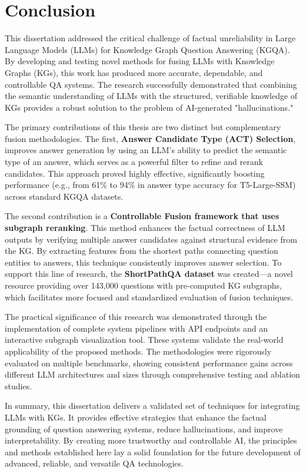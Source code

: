 \chapter*{Conclusion}
\label{chap:conclusion}

This dissertation addressed the critical challenge of factual unreliability in Large Language Models (LLMs) for Knowledge Graph Question Answering (KGQA). By developing and testing novel methods for fusing LLMs with Knowledge Graphs (KGs), this work has produced more accurate, dependable, and controllable QA systems. The research successfully demonstrated that combining the semantic understanding of LLMs with the structured, verifiable knowledge of KGs provides a robust solution to the problem of AI-generated "hallucinations."

The primary contributions of this thesis are two distinct but complementary fusion methodologies. The first, \textbf{Answer Candidate Type (ACT) Selection}, improves answer generation by using an LLM's ability to predict the semantic type of an answer, which serves as a powerful filter to refine and rerank candidates. This approach proved highly effective, significantly boosting performance (e.g., from 61\% to 94\% in answer type accuracy for T5-Large-SSM) across standard KGQA datasets.

The second contribution is a \textbf{Controllable Fusion framework that uses subgraph reranking}. This method enhances the factual correctness of LLM outputs by verifying multiple answer candidates against structural evidence from the KG. By extracting features from the shortest paths connecting question entities to answers, this technique consistently improves answer selection. To support this line of research, the \textbf{ShortPathQA dataset} was created—a novel resource providing over 143,000 questions with pre-computed KG subgraphs, which facilitates more focused and standardized evaluation of fusion techniques.

The practical significance of this research was demonstrated through the implementation of complete system pipelines with API endpoints and an interactive subgraph visualization tool. These systems validate the real-world applicability of the proposed methods. The methodologies were rigorously evaluated on multiple benchmarks, showing consistent performance gains across different LLM architectures and sizes through comprehensive testing and ablation studies.

In summary, this dissertation delivers a validated set of techniques for integrating LLMs with KGs. It provides effective strategies that enhance the factual grounding of question answering systems, reduce hallucinations, and improve interpretability. By creating more trustworthy and controllable AI, the principles and methods established here lay a solid foundation for the future development of advanced, reliable, and versatile QA technologies.
